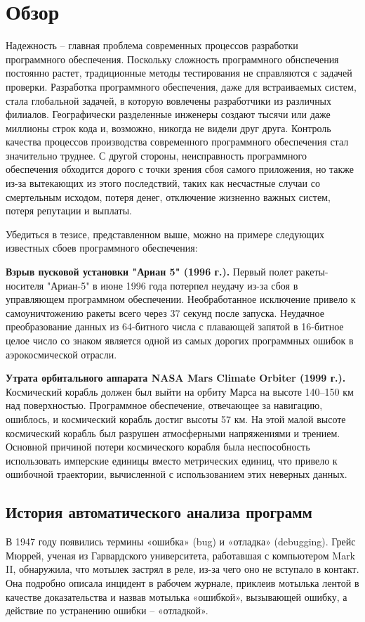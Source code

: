 \chapter{Обзор}\label{ch:ch1}
Надежность -- главная проблема современных процессов разработки программного обеспечения. Поскольку сложность программного обнспечения постоянно растет, традиционные 
методы тестирования не справляются с задачей проверки. Разработка программного обеспечения, даже для встраиваемых систем, стала глобальной задачей, в 
которую вовлечены разработчики из различных филиалов. Географически разделенные инженеры создают тысячи или даже миллионы строк кода и, возможно, 
никогда не видели друг друга. Контроль качества процессов производства современного программного обеспечения стал значительно труднее. С другой стороны, 
неисправность программного обеспечения обходится дорого с точки зрения сбоя самого приложения, но также из-за вытекающих из этого последствий, таких как 
несчастные случаи со смертельным исходом, потеря денег, отключение жизненно важных систем, потеря репутации и выплаты.

Убедиться в тезисе, представленном выше, можно на примере следующих известных сбоев программного обеспечения:

\textbf{Взрыв пусковой установки "Ариан 5" (1996 г.).} Первый полет ракеты-носителя "Ариан-5" в июне 1996 года потерпел неудачу из-за сбоя в управляющем 
программном обеспечении. Необработанное исключение привело к самоуничтожению ракеты всего через 37 секунд после запуска. Неудачное преобразование 
данных из 64-битного числа с плавающей запятой в 16-битное целое число со знаком является одной из самых дорогих программных ошибок в аэрокосмической отрасли\cite{Lions1996ARIANE5F}.

\textbf{Утрата орбитального аппарата NASA Mars Climate Orbiter (1999 г.).} Космический корабль должен был выйти на орбиту Марса на высоте 140–150 км над поверхностью. Программное обеспечение, отвечающее за навигацию, ошиблось, и космический корабль достиг высоты 57 км. На этой малой высоте космический корабль был разрушен атмосферными напряжениями и трением. Основной причиной потери космического корабля была неспособность использовать имперские единицы вместо метрических единиц, что привело к
ошибочной траектории, вычисленной с использованием этих неверных данных.\cite{10.5555/2601694}

\section{История автоматического анализа программ}\label{sec:ch1/sec1}
В 1947 году появились термины «ошибка» (bug) и «отладка» (debugging). Грейс Мюррей, 
ученая из Гарвардского университета, работавшая с компьютером Mark II, обнаружила, 
что мотылек застрял в реле, из-за чего оно не вступало в контакт. Она подробно 
описала инцидент в рабочем журнале, приклеив мотылька лентой в качестве доказательства и 
назвав мотылька «ошибкой», вызывающей ошибку, а действие по устранению ошибки -- «отладкой».

